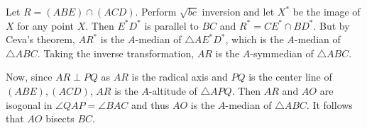 Let $R=\left(ABE\right)\cap\left(ACD\right)$. Perform $\sqrt{bc}$ inversion and let $X^*$ be the image of $X$ for any point $X$. Then $E^*D^*$ is parallel to $BC$ and $R^*=CE^*\cap BD^*$. But by Ceva's theorem, $AR^*$ is the $A$-median of $\triangle{AE^*D^*}$, which is the $A$-median of $\triangle{ABC}$. Taking the inverse transformation, $AR$ is the $A$-symmedian of $\triangle{ABC}$.

Now, since $AR\perp PQ$ as $AR$ is the radical axis and $PQ$ is the center line of $\left(ABE\right),\left(ACD\right)$, $AR$ is the $A$-altitude of $\triangle{APQ}$. Then $AR$ and $AO$ are isogonal in $\angle{QAP}=\angle{BAC}$ and thus $AO$ is the $A$-median of $\triangle{ABC}$. It follows that $AO$ bisects $BC$.